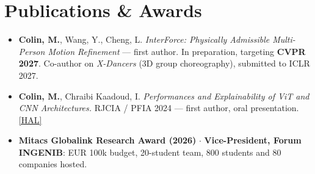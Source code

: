 \documentclass[10pt, letterpaper]{article}
\begin{document}
\section{Publications \& Awards}
\begin{itemize}
    \item \textbf{Colin, M.}, Wang, Y., Cheng, L. \textit{InterForce: Physically Admissible Multi-Person Motion Refinement} --- first author. In preparation, targeting \textbf{CVPR 2027}. Co-author on \textit{X-Dancers} (3D group choreography), submitted to ICLR 2027.
    \item \textbf{Colin, M.}, Chraibi Kaadoud, I. \textit{Performances and Explainability of ViT and CNN Architectures.} RJCIA / PFIA 2024 --- first author, oral presentation. \href{https://hal.science/hal-04641791}{[HAL]}
    \item \textbf{Mitacs Globalink Research Award (2026)} $\cdot$ \textbf{Vice-President, Forum INGENIB}: EUR 100k budget, 20-student team, 800 students and 80 companies hosted.
\end{itemize}
\end{document}
